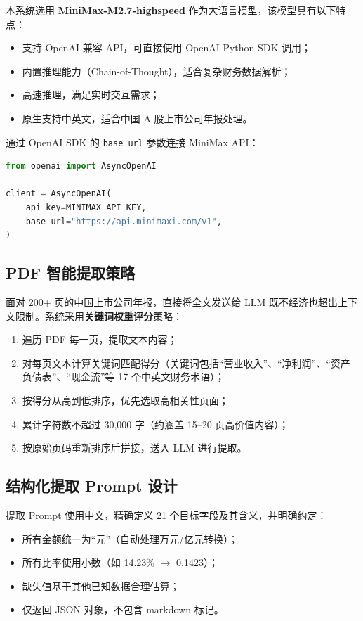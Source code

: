 \documentclass[12pt,a4paper]{article}
\begin{document}
本系统选用 \textbf{MiniMax-M2.7-highspeed} 作为大语言模型，该模型具有以下特点：

\begin{itemize}[leftmargin=2em]
  \item 支持 OpenAI 兼容 API，可直接使用 OpenAI Python SDK 调用；
  \item 内置推理能力（Chain-of-Thought），适合复杂财务数据解析；
  \item 高速推理，满足实时交互需求；
  \item 原生支持中英文，适合中国 A 股上市公司年报处理。
\end{itemize}

通过 OpenAI SDK 的 \texttt{base\_url} 参数连接 MiniMax API：

\begin{lstlisting}[language=Python,caption=MiniMax LLM 客户端初始化]
from openai import AsyncOpenAI

client = AsyncOpenAI(
    api_key=MINIMAX_API_KEY,
    base_url="https://api.minimaxi.com/v1",
)
\end{lstlisting}

\subsection{PDF 智能提取策略}

面对 200+ 页的中国上市公司年报，直接将全文发送给 LLM 既不经济也超出上下文限制。系统采用\textbf{关键词权重评分}策略：

\begin{enumerate}[leftmargin=2em]
  \item 遍历 PDF 每一页，提取文本内容；
  \item 对每页文本计算关键词匹配得分（关键词包括``营业收入''、``净利润''、``资产负债表''、``现金流''等 17 个中英文财务术语）；
  \item 按得分从高到低排序，优先选取高相关性页面；
  \item 累计字符数不超过 30,000 字（约涵盖 15--20 页高价值内容）；
  \item 按原始页码重新排序后拼接，送入 LLM 进行提取。
\end{enumerate}

\subsection{结构化提取 Prompt 设计}

提取 Prompt 使用中文，精确定义 21 个目标字段及其含义，并明确约定：

\begin{itemize}[leftmargin=2em]
  \item 所有金额统一为``元''（自动处理万元/亿元转换）；
  \item 所有比率使用小数（如 14.23\% $\to$ 0.1423）；
  \item 缺失值基于其他已知数据合理估算；
  \item 仅返回 JSON 对象，不包含 markdown 标记。
\end{itemize}
\end{document}
